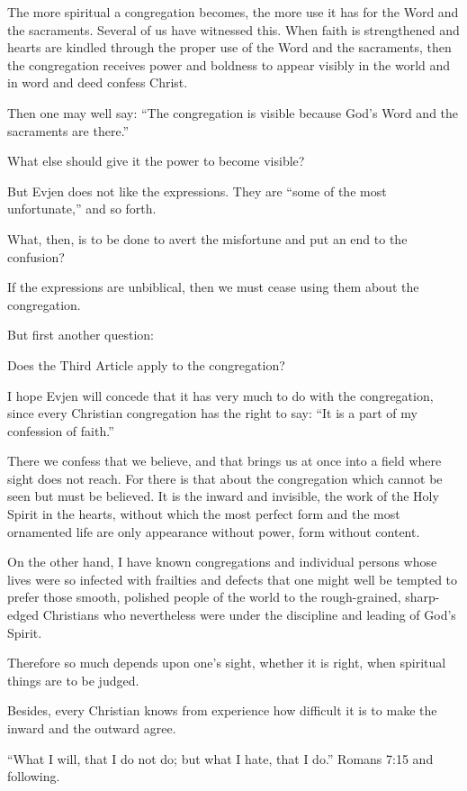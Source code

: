 The more spiritual a congregation becomes, the more use it has for the Word and the sacraments. Several of us have witnessed this. When faith is strengthened and hearts are kindled through the proper use of the Word and the sacraments, then the congregation receives power and boldness to appear visibly in the world and in word and deed confess Christ.

Then one may well say: “The congregation is visible because God’s Word and the sacraments are there.”

What else should give it the power to become visible?

But Evjen does not like the expressions. They are “some of the most unfortunate,” and so forth.

What, then, is to be done to avert the misfortune and put an end to the confusion?

If the expressions are unbiblical, then we must cease using them about the congregation.

But first another question:

Does the Third Article apply to the congregation?

I hope Evjen will concede that it has very much to do with the congregation, since every Christian congregation has the right to say: “It is a part of my confession of faith.”

There we confess that we believe, and that brings us at once into a field where sight does not reach. For there is that about the congregation which cannot be seen but must be believed. It is the inward and invisible, the work of the Holy Spirit in the hearts, without which the most perfect form and the most ornamented life are only appearance without power, form without content.

On the other hand, I have known congregations and individual persons whose lives were so infected with frailties and defects that one might well be tempted to prefer those smooth, polished people of the world to the rough-grained, sharp-edged Christians who nevertheless were under the discipline and leading of God’s Spirit.

Therefore so much depends upon one’s sight, whether it is right, when spiritual things are to be judged.

Besides, every Christian knows from experience how difficult it is to make the inward and the outward agree.

“What I will, that I do not do; but what I hate, that I do.” Romans 7:15 and following.

